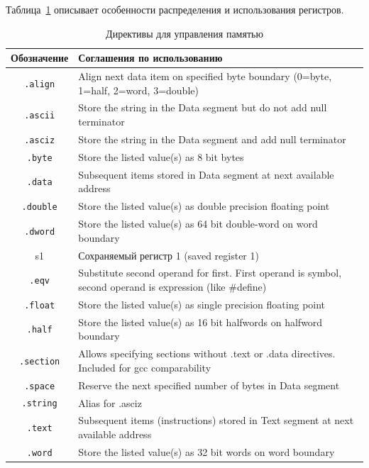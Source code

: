 Таблица~\ref{table-control-direct} описывает особенности распределения и использования регистров.

\begin{table}[h]
    \caption{Директивы для управления памятью}
    \centering
    \begin{tabularx}{\textwidth}{|c|X|}
        \hline
        \textbf{Обозначение} & \textbf{Соглашения по использованию} \\
        \hline %
        \verb|.align| & Align next data item on specified byte boundary (0=byte, 1=half, 2=word, 3=double) \\
        \hline
        \verb|.ascii| & Store the string in the Data segment but do not add null terminator \\
        \hline
        \verb|.asciz| & Store the string in the Data segment and add null terminator \\
        \hline
        \verb|.byte| & Store the listed value(s) as 8 bit bytes \\
        \hline
        \verb|.data| & Subsequent items stored in Data segment at next available address \\
        \hline
        \verb|.double| & Store the listed value(s) as double precision floating point \\
        \hline
        \verb|.dword| & Store the listed value(s) as 64 bit double-word on word boundary \\
        \hline
        s1 & Сохраняемый регистр 1 (saved register 1) \\
        \hline
        \verb|.eqv| & Substitute second operand for first. First operand is symbol, second operand is expression (like \#define) \\
        \hline
        \verb|.float| & Store the listed value(s) as single precision floating point \\
        \hline
        \verb|.half| & Store the listed value(s) as 16 bit halfwords on halfword boundary \\
        \hline
        \verb|.section| & Allows specifying sections without .text or .data directives. Included for gcc comparability \\
        \hline
        \verb|.space| & Reserve the next specified number of bytes in Data segment \\
        \hline
        \verb|.string| & Alias for .asciz \\
        \hline
        \verb|.text| & Subsequent items (instructions) stored in Text segment at next available address \\
        \verb|.word| & Store the listed value(s) as 32 bit words on word boundary \\
        \hline
    \end{tabularx}
    \label{table-control-direct}
\end{table}

